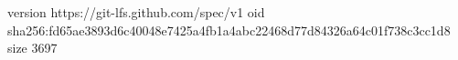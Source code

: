 version https://git-lfs.github.com/spec/v1
oid sha256:fd65ae3893d6c40048e7425a4fb1a4abc22468d77d84326a64c01f738c3cc1d8
size 3697
